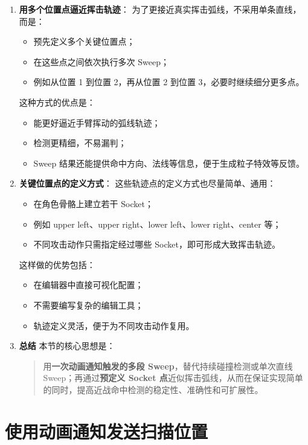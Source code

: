 \begin{enumerate}
	\item \textbf{用多个位置点逼近挥击轨迹}：
	为了更接近真实挥击弧线，不采用单条直线，而是：
	\begin{itemize}
		\item 预先定义多个关键位置点；
		\item 在这些点之间依次执行多次 Sweep；
		\item 例如从位置 1 到位置 2，再从位置 2 到位置 3，必要时继续细分更多点。
	\end{itemize}
	这种方式的优点是：
	\begin{itemize}
		\item 能更好逼近手臂挥动的弧线轨迹；
		\item 检测更精细，不易漏判；
		\item Sweep 结果还能提供命中方向、法线等信息，便于生成粒子特效等反馈。
	\end{itemize}
	
	\item \textbf{关键位置点的定义方式}：
	这些轨迹点的定义方式也尽量简单、通用：
	\begin{itemize}
		\item 在角色骨骼上建立若干 Socket；
		\item 例如 upper left、upper right、lower left、lower right、center 等；
		\item 不同攻击动作只需指定经过哪些 Socket，即可形成大致挥击轨迹。
	\end{itemize}
	这样做的优势包括：
	\begin{itemize}
		\item 在编辑器中直接可视化配置；
		\item 不需要编写复杂的编辑工具；
		\item 轨迹定义灵活，便于为不同攻击动作复用。
	\end{itemize}
	
	\item \textbf{总结}
	本节的核心思想是：
	\begin{quote}
		用\textbf{一次动画通知触发的多段 Sweep}，替代持续碰撞检测或单次直线 Sweep；再通过\textbf{预定义 Socket 点}近似挥击弧线，从而在保证实现简单的同时，提高近战命中检测的稳定性、准确性和可扩展性。
	\end{quote}
\end{enumerate}

\section{使用动画通知发送扫描位置}

